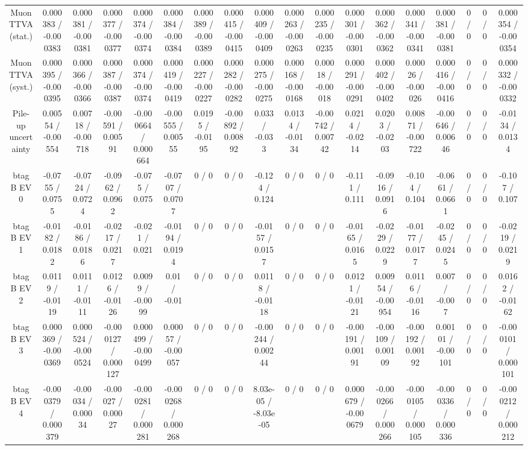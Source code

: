 \documentclass[10pt]{article}
\begin{document}
\begin{table}[htbp]
\begin{center}
\begin{tabular}{|c|c|c|c|c|c|c|c|c|c|c|c|c|c|c|c|c|c|}
  Muon TTVA (stat.) & 0.000383 / -0.000383 & 0.000381 / -0.000381 & 0.000377 / -0.000377 & 0.000374 / -0.000374 & 0.000384 / -0.000384 & 0.000389 / -0.000389 & 0.000415 / -0.000415 & 0.000409 / -0.000409 & 0.000263 / -0.000263 & 0.000235 / -0.000235 & 0.000301 / -0.000301 & 0.000362 / -0.000362 & 0.000341 / -0.000341 & 0.000381 / -0.000381 & 0 / 0 & 0 / 0 & 0.000354 / -0.000354 \\ 
  Muon TTVA (syst.) & 0.000395 / -0.000395 & 0.000366 / -0.000366 & 0.000387 / -0.000387 & 0.000374 / -0.000374 & 0.000419 / -0.000419 & 0.000227 / -0.000227 & 0.000282 / -0.000282 & 0.000275 / -0.000275 & 0.000168 / -0.000168 & 0.00018 / -0.00018 & 0.000291 / -0.000291 & 0.000402 / -0.000402 & 0.00026 / -0.00026 & 0.000416 / -0.000416 & 0 / 0 & 0 / 0 & 0.000332 / -0.000332 \\ 
  Pile-up uncertainty & 0.00554 / -0.00554 & 0.00718 / -0.00718 & -0.00591 / 0.00591 & -0.000664 / 0.000664 & -0.00555 / 0.00555 & 0.0195 / -0.0195 & -0.00892 / 0.00892 & 0.033 / -0.033 & 0.0134 / -0.0134 & -0.00742 / 0.00742 & 0.0214 / -0.0214 & 0.0203 / -0.0203 & 0.00871 / -0.00722 & -0.00646 / 0.00646 & 0 / 0 & 0 / 0 & -0.0134 / 0.0134 \\ 
  btag B EV 0 & -0.0755 / 0.0755 & -0.0724 / 0.0724 & -0.0962 / 0.0962 & -0.075 / 0.075 & -0.0707 / 0.0707 & 0 / 0 & 0 / 0 & -0.124 / 0.124 & 0 / 0 & 0 / 0 & -0.111 / 0.111 & -0.0916 / 0.0916 & -0.104 / 0.104 & -0.0661 / 0.0661 & 0 / 0 & 0 / 0 & -0.107 / 0.107 \\ 
  btag B EV 1 & -0.0182 / 0.0182 & -0.0186 / 0.0186 & -0.0217 / 0.0217 & -0.021 / 0.021 & -0.0194 / 0.0194 & 0 / 0 & 0 / 0 & -0.0157 / 0.0157 & 0 / 0 & 0 / 0 & -0.0165 / 0.0165 & -0.0229 / 0.0229 & -0.0177 / 0.0177 & -0.0245 / 0.0245 & 0 / 0 & 0 / 0 & -0.0219 / 0.0219 \\ 
  btag B EV 2 & 0.0119 / -0.0119 & 0.0111 / -0.0111 & 0.0126 / -0.0126 & 0.0099 / -0.0099 & 0.01 / -0.01 & 0 / 0 & 0 / 0 & 0.0118 / -0.0118 & 0 / 0 & 0 / 0 & 0.0121 / -0.0121 & 0.00954 / -0.00954 & 0.0116 / -0.0116 & 0.007 / -0.007 & 0 / 0 & 0 / 0 & 0.0162 / -0.0162 \\ 
  btag B EV 3 & 0.000369 / -0.000369 & 0.000524 / -0.000524 & -0.000127 / 0.000127 & 0.000499 / -0.000499 & 0.00057 / -0.00057 & 0 / 0 & 0 / 0 & -0.00244 / 0.00244 & 0 / 0 & 0 / 0 & -0.00191 / 0.00191 & -0.00109 / 0.00109 & -0.00192 / 0.00192 & 0.00101 / -0.00101 & 0 / 0 & 0 / 0 & -0.000101 / 0.000101 \\ 
  btag B EV 4 & -0.000379 / 0.000379 & -0.00034 / 0.00034 & -0.00027 / 0.00027 & -0.000281 / 0.000281 & -0.000268 / 0.000268 & 0 / 0 & 0 / 0 & 8.03e-05 / -8.03e-05 & 0 / 0 & 0 / 0 & 0.000679 / -0.000679 & -0.000266 / 0.000266 & -0.000105 / 0.000105 & -0.000336 / 0.000336 & 0 / 0 & 0 / 0 & -0.000212 / 0.000212 \\ 

\end{tabular}
\end{center}
\end{table}
\end{document}
